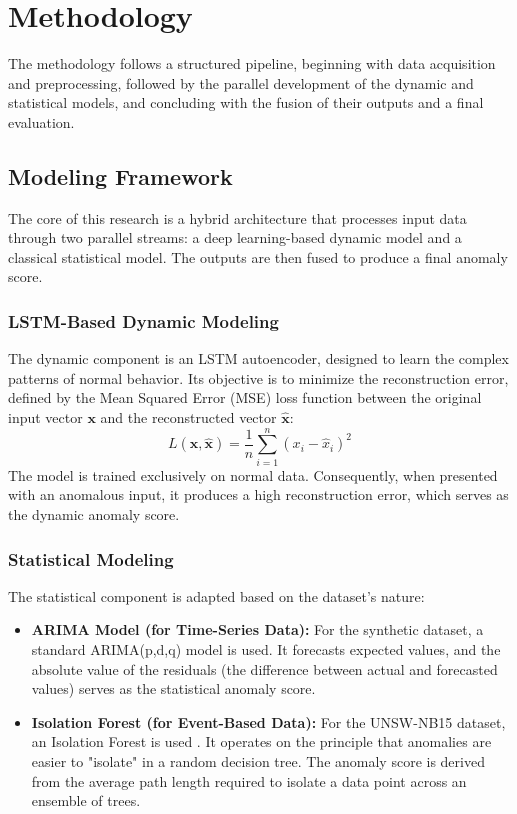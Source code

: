 \documentclass[conference]{IEEEtran}
\begin{document}
\section{Methodology}
The methodology follows a structured pipeline, beginning with data acquisition and preprocessing, followed by the parallel development of the dynamic and statistical models, and concluding with the fusion of their outputs and a final evaluation.

\subsection{Modeling Framework}
The core of this research is a hybrid architecture that processes input data through two parallel streams: a deep learning-based dynamic model and a classical statistical model. The outputs are then fused to produce a final anomaly score.

\subsubsection{LSTM-Based Dynamic Modeling}
The dynamic component is an LSTM autoencoder, designed to learn the complex patterns of normal behavior. Its objective is to minimize the reconstruction error, defined by the Mean Squared Error (MSE) loss function between the original input vector $\mathbf{x}$ and the reconstructed vector $\mathbf{\hat{x}}$:
\begin{equation}
L(\mathbf{x}, \mathbf{\hat{x}}) = \frac{1}{n} \sum_{i=1}^{n} (x_i - \hat{x}_i)^2
\label{eq:mse}
\end{equation}
The model is trained exclusively on normal data. Consequently, when presented with an anomalous input, it produces a high reconstruction error, which serves as the dynamic anomaly score.

\subsubsection{Statistical Modeling}
The statistical component is adapted based on the dataset's nature:
\begin{itemize}
    \item \textbf{ARIMA Model (for Time-Series Data):} For the synthetic dataset, a standard ARIMA(p,d,q) model is used. It forecasts expected values, and the absolute value of the residuals (the difference between actual and forecasted values) serves as the statistical anomaly score.
    \item \textbf{Isolation Forest (for Event-Based Data):} For the UNSW-NB15 dataset, an Isolation Forest is used \cite{b2}. It operates on the principle that anomalies are easier to "isolate" in a random decision tree. The anomaly score is derived from the average path length required to isolate a data point across an ensemble of trees.
\end{itemize}
\end{document}
